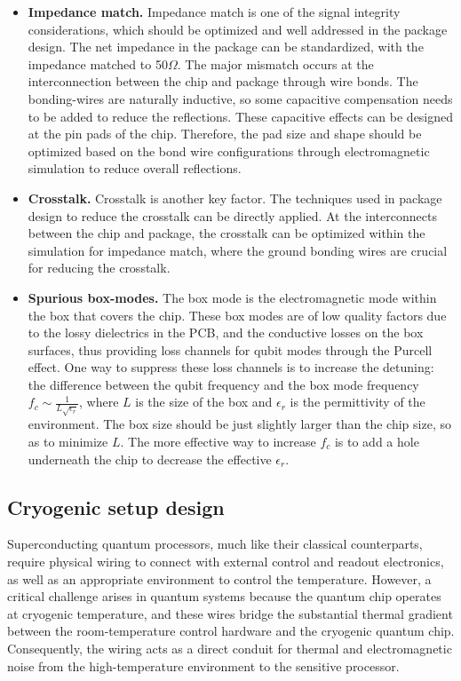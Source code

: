 \documentclass[a4paper,onecolumn,11pt,unpublished]{quantumarticle}
\begin{document}
\begin{itemize}
    \item \textbf{Impedance match.} Impedance match is one of the signal integrity considerations, which should be optimized and well addressed in the package design. The net impedance in the package can be standardized, with the impedance matched to 50$\Omega$. The major mismatch occurs at the interconnection between the chip and package through wire bonds. The bonding-wires are naturally inductive, so some capacitive compensation needs to be added to reduce the reflections. These capacitive effects can be designed at the pin pads of the chip. Therefore, the pad size and shape should be optimized based on the bond wire configurations through electromagnetic simulation to reduce overall reflections. 
    \item \textbf{Crosstalk.} Crosstalk is another key factor. The techniques used in package design to reduce the crosstalk can be directly applied. At the interconnects between the chip and package, the crosstalk can be optimized within the simulation for impedance match, where the ground bonding wires are crucial for reducing the crosstalk. 
    \item \textbf{Spurious box-modes.} The box mode is the electromagnetic mode within the box that covers the chip. These box modes are of low quality factors due to the lossy dielectrics in the PCB, and the conductive losses on the box surfaces, thus providing loss channels for qubit modes through the Purcell effect. One way to suppress these loss channels is to increase the detuning: the difference between the qubit frequency and the box mode frequency $f_c \sim \frac{1}{L \sqrt{\epsilon_r}}$, where $L$ is the size of the box and $\epsilon_r$ is the permittivity of the environment. The box size should be just slightly larger than the chip size, so as to minimize $L$. The more effective way to increase $f_c$ is to add a hole underneath the chip to decrease the effective $\epsilon_r$. 
\end{itemize}

\subsection{Cryogenic setup design}

Superconducting quantum processors, much like their classical counterparts, require physical wiring to connect with external control and readout electronics, as well as an appropriate environment to control the temperature. However, a critical challenge arises in quantum systems because the quantum chip operates at cryogenic temperature, and these wires bridge the substantial thermal gradient between the room-temperature control hardware and the cryogenic quantum chip. Consequently, the wiring acts as a direct conduit for thermal and electromagnetic noise from the high-temperature environment to the sensitive processor.
\end{document}
